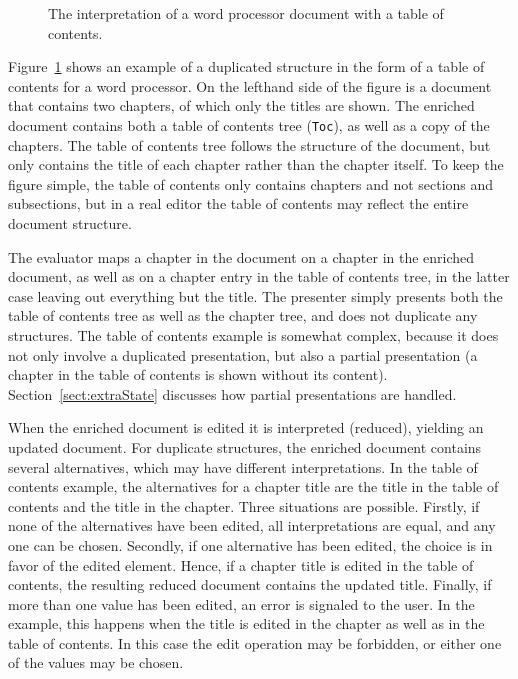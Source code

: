 \begin{figure}
\begin{center}
\begin{center}
%
%
\end{center}
\caption{The interpretation of a word processor document with a table of contents.}\label{duplicatesExample} 
\end{center}
\end{figure}

Figure~\ref{duplicatesExample} shows an example of a duplicated structure in the form of a table of contents for a word processor. On the lefthand side of the figure is a document that contains two chapters, of which only the titles are shown. The enriched document contains both a table of contents tree (\verb|Toc|), as well as a copy of the chapters. The table of contents tree follows the structure of the document, but only contains the title of each chapter rather than the chapter itself. To keep the figure simple, the table of contents only contains chapters and not sections and subsections, but in a real editor the table of contents may reflect the entire document structure. 

The evaluator maps a chapter in the document on a chapter in the enriched document, as well as on a chapter entry in the table of contents tree, in the latter case leaving out everything but the title. The presenter simply presents both the table of contents tree as well as the chapter tree, and does not duplicate any structures. The table of contents example is somewhat complex, because it does not only involve a duplicated presentation, but also a partial presentation (a chapter in the table of contents is shown without its content). Section~\ref{sect:extraState} discusses how partial presentations are handled.

When the enriched document is edited it is interpreted (reduced), yielding an updated document. For duplicate structures, the enriched document contains several alternatives, which may have different interpretations. In the table of contents example, the alternatives for a chapter title are the title in the table of contents and the title in the chapter. Three situations are possible. Firstly, if none of the alternatives have been edited, all interpretations are equal, and any one can be chosen. Secondly, if one alternative has been edited, the choice is in favor of the edited element. Hence, if a chapter title is edited in the table of contents, the resulting reduced document contains the updated title. Finally, if more than one value has been edited, an error is signaled to the user. In the example, this happens when the title is edited in the chapter as well as in the table of contents. In this case the edit operation may be forbidden, or either one of the values may be chosen.  

